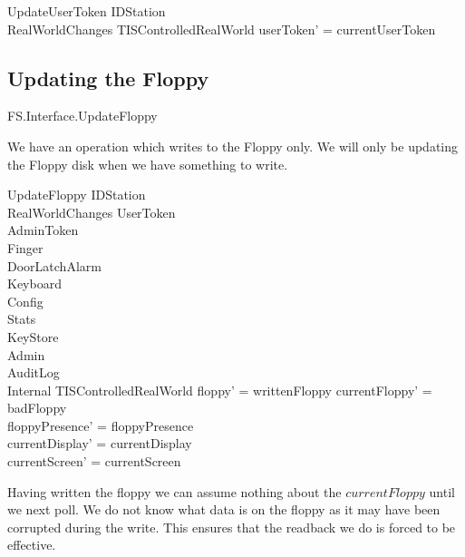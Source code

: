 \begin{schema}{UpdateUserToken}
	\Xi IDStation
\\	RealWorldChanges
\also
        \Xi TISControlledRealWorld
\where
	userToken' = currentUserToken
\end{schema}

\subsection{Updating the Floppy}

\begin{traceunit}{FS.Interface.UpdateFloppy}
\end{traceunit}


We have an operation which writes to the Floppy only.
We will only be updating the Floppy disk when we have something to write.

\begin{schema}{UpdateFloppy}
        \Delta IDStation
\\      RealWorldChanges
\also
        \Xi UserToken
\\      \Xi AdminToken
\\      \Xi Finger
\\      \Xi DoorLatchAlarm
\\      \Xi Keyboard
\\      \Xi Config
\\      \Xi Stats
\\      \Xi KeyStore
\\      \Xi Admin      
\\      \Xi AuditLog
\\      \Xi Internal
\also
	\Xi TISControlledRealWorld
\where
	floppy' = writtenFloppy
\also
        currentFloppy' = badFloppy
\\      floppyPresence' = floppyPresence
\\      currentDisplay' = currentDisplay
\\      currentScreen' = currentScreen
\end{schema}
\begin{Zcomment}
\item
Having written the floppy we can assume nothing about the $currentFloppy$
until we next poll. We do not know what data is on the floppy as it
may have been corrupted during the write. This ensures that the
readback we do is forced to be effective. 
\end{Zcomment}
